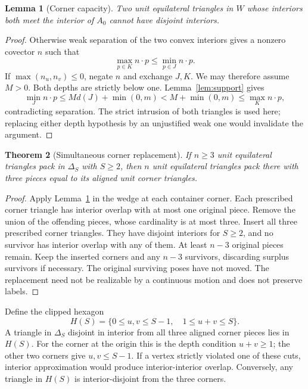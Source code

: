 \documentclass[11pt]{article}
\newtheorem{theorem}{Theorem}[section]
\newtheorem{lemma}[theorem]{Lemma}
\begin{document}
\begin{lemma}[Corner capacity]\label{lem:corner-capacity}
Two unit equilateral triangles in $W$ whose interiors both meet the interior of $A_0$ cannot have disjoint interiors.
\end{lemma}

\begin{proof}
Otherwise weak separation of the two convex interiors gives a nonzero covector $n$ such that
\[
 \max_{p\in K}n\cdot p\le\min_{p\in J}n\cdot p.
\]
If $\max(n_u,n_v)\le0$, negate $n$ and exchange $J,K$. We may therefore assume $M>0$. Both depths are strictly below one. Lemma~\ref{lem:support} gives
\[
 \min_Jn\cdot p\le Md(J)+\min(0,m)
 <M+\min(0,m)\le\max_Kn\cdot p,
\]
contradicting separation. The strict intrusion of both triangles is used here; replacing either depth hypothesis by an unjustified weak one would invalidate the argument.
\end{proof}

\begin{theorem}[Simultaneous corner replacement]\label{thm:corners}
If $n\ge3$ unit equilateral triangles pack in $\Delta_S$ with $S\ge2$, then $n$ unit equilateral triangles pack there with three pieces equal to its aligned unit corner triangles.
\end{theorem}

\begin{proof}
Apply Lemma~\ref{lem:corner-capacity} in the wedge at each container corner. Each prescribed corner triangle has interior overlap with at most one original piece. Remove the union of the offending pieces, whose cardinality is at most three. Insert all three prescribed corner triangles. They have disjoint interiors for $S\ge2$, and no survivor has interior overlap with any of them. At least $n-3$ original pieces remain. Keep the inserted corners and any $n-3$ survivors, discarding surplus survivors if necessary. The original surviving poses have not moved. The replacement need not be realizable by a continuous motion and does not preserve labels.
\end{proof}

Define the clipped hexagon
\begin{equation}\label{eq:hexagon}
 H(S)=\{0\le u,v\le S-1,\quad1\le u+v\le S\}.
\end{equation}
A triangle in $\Delta_S$ disjoint in interior from all three aligned corner pieces lies in $H(S)$. For the corner at the origin this is the depth condition $u+v\ge1$; the other two corners give $u,v\le S-1$. If a vertex strictly violated one of these cuts, interior approximation would produce interior-interior overlap. Conversely, any triangle in $H(S)$ is interior-disjoint from the three corners.
\end{document}
